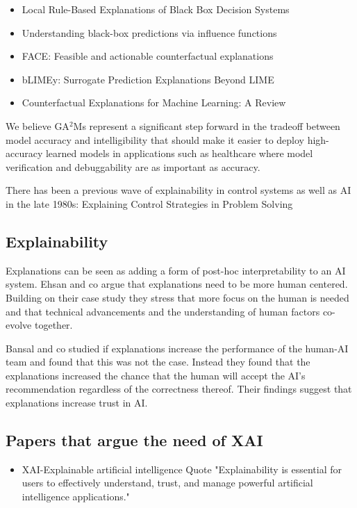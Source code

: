 \documentclass[manuscript,screen,review]{acmart}
\begin{document}
\begin{itemize}
    \item Local Rule-Based Explanations of Black Box Decision Systems\cite{Guidotti2018}
    \item Understanding black-box predictions via influence functions\cite{Koh2017}
    \item FACE: Feasible and actionable counterfactual explanations\cite{Poyiadzi2020}
    \item bLIMEy: Surrogate Prediction Explanations Beyond LIME\cite{Sokol2019}
    \item Counterfactual Explanations for Machine Learning: A Review\cite{Verma2020}
\end{itemize}

We believe GA$^2$Ms represent a significant step forward in the tradeoff between model accuracy and intelligibility that should make it easier to deploy high-accuracy learned models in applications such
as healthcare where model verification and debuggability are as important as accuracy.\cite{Caruana2015}

There has been a previous wave of explainability in control systems as well as AI in the late 1980s: Explaining Control Strategies in Problem Solving\cite{Chandrasekaran1989}

\subsection{Explainability}\label{subsec:explainability}
Explanations can be seen as adding a form of post-hoc interpretability to an AI system.
Ehsan and co argue that explanations need to be more human centered.
Building on their case study they stress that more focus on the human is needed and that technical advancements and the understanding of human factors co-evolve together.\cite{Ehsan2020}

Bansal and co studied if explanations increase the performance of the human-AI team and found that this was not the case.
Instead they found that the explanations increased the chance that the human will accept the AI's recommendation regardless of
the correctness thereof.
Their findings suggest that explanations increase trust in AI.\cite{Bansal2020}

\subsection{Papers that argue the need of XAI}
\begin{itemize}
    \item XAI-Explainable artificial intelligence\cite{Gunning2019} Quote "Explainability is essential for users to effectively understand, trust, and manage powerful artificial intelligence applications."
\end{itemize}
\end{document}
